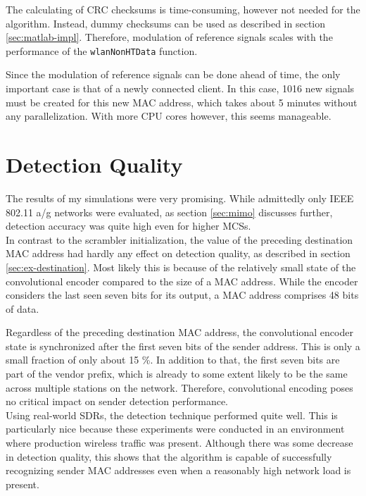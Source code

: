 The calculating of \gls{CRC} checksums is time-consuming, however not needed for the algorithm. Instead, dummy checksums can be used as described in section \ref{sec:matlab-impl}. Therefore, modulation of reference signals scales with the performance of the \texttt{wlanNonHTData} function.

Since the modulation of reference signals can be done ahead of time, the only important case is that of a newly connected client. In this case, 1016 new signals must be created for this new \gls{MAC} address, which takes about 5 minutes without any parallelization. With more CPU cores however, this seems manageable.



\section{Detection Quality}\label{sec:detection-quality}

The results of my simulations were very promising. While admittedly only IEEE 802.11 a/g networks were evaluated, as section \ref{sec:mimo} discusses further, detection accuracy was quite high even for higher \glspl{MCS}.\\

In contrast to the scrambler initialization, the value of the preceding destination \gls{MAC} address had hardly any effect on detection quality, as described in section \ref{sec:ex-destination}. Most likely this is because of the relatively small state of the convolutional encoder compared to the size of a \gls{MAC} address. While the encoder considers the last seen seven bits for its output, a \gls{MAC} address comprises 48 bits of data.

Regardless of the preceding destination \gls{MAC} address, the convolutional encoder state is synchronized after the first seven bits of the sender address. This is only a small fraction of only about 15 \%. In addition to that, the first seven bits are part of the vendor prefix, which is already to some extent likely to be the same across multiple stations on the network. Therefore, convolutional encoding poses no critical impact on sender detection performance.\\

Using real-world \glspl{SDR}, the detection technique performed quite well. This is particularly nice because these experiments were conducted in an environment where production wireless traffic was present. Although there was some decrease in detection quality, this shows that the algorithm is capable of successfully recognizing sender \gls{MAC} addresses even when a reasonably high network load is present.


